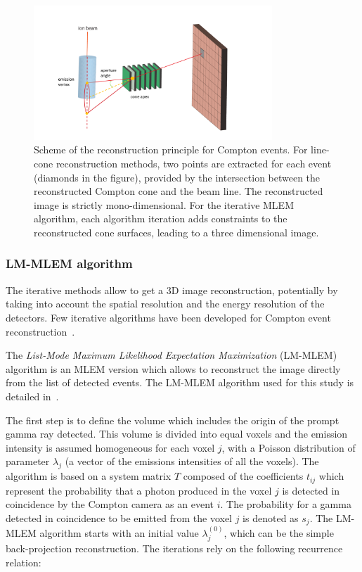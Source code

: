 \begin{figure}
\centering
  \includegraphics[width=0.8\textwidth]{./Figure/reconstruction_scheme}
  \caption{Scheme of the reconstruction principle for Compton events. For line-cone reconstruction methods, two points are extracted for each event (diamonds in the figure), provided by the intersection between the reconstructed Compton cone and the beam line. The reconstructed image is strictly mono-dimensional. For the iterative MLEM algorithm, each algorithm iteration adds constraints to the reconstructed cone surfaces, leading to  a three dimensional image.}	
  \label{fig:reconstruction_scheme}
\end{figure}

\subsubsection{LM-MLEM algorithm}	
The iterative methods allow to get a 3D image reconstruction, potentially by taking into account the spatial resolution and the energy resolution of the detectors. Few iterative algorithms have been developed for Compton event reconstruction~\cite{schone_common_2010, zoglauer_design_2011,gillam_compton_2011,mackin_evaluation_2012,lojacono_low_2013}.

The \textit{List-Mode Maximum Likelihood Expectation Maximization} (LM-MLEM) algorithm is an MLEM version which allows to reconstruct the image directly from the list of detected events.
The LM-MLEM algorithm used for this study is detailed in~\cite{maxim_filtered_2014,hilaire_compton_2014}.%

The first step is to define the volume which includes the origin of the prompt gamma ray detected. This volume is divided into equal voxels and the emission intensity is assumed homogeneous for each voxel $j$, with a Poisson distribution of parameter $\lambda_j$ (a vector of the emissions intensities of all the voxels). The algorithm is based on a system matrix $T$ composed of the coefficients  $t_{ij}$ which represent the probability that a photon produced in the voxel $j$ is detected in coincidence by the Compton camera as an event $i$. The probability for a gamma detected in coincidence to be emitted from the voxel $j$ is denoted as $s_j$.
The LM-MLEM algorithm starts with an initial value $\lambda^{(0)}_j$, which can be the simple back-projection reconstruction.
The iterations rely on the following recurrence relation:

